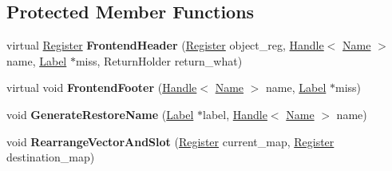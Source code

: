 \subsection*{Protected Member Functions}
\begin{DoxyCompactItemize}
\item 
virtual \hyperlink{structv8_1_1internal_1_1_register}{Register} {\bfseries Frontend\+Header} (\hyperlink{structv8_1_1internal_1_1_register}{Register} object\+\_\+reg, \hyperlink{classv8_1_1internal_1_1_handle}{Handle}$<$ \hyperlink{classv8_1_1internal_1_1_name}{Name} $>$ name, \hyperlink{classv8_1_1internal_1_1_label}{Label} $\ast$miss, Return\+Holder return\+\_\+what)\hypertarget{classv8_1_1internal_1_1_named_store_handler_compiler_a099e5c8306c4da71ad0a5193a9493e90}{}\label{classv8_1_1internal_1_1_named_store_handler_compiler_a099e5c8306c4da71ad0a5193a9493e90}

\item 
virtual void {\bfseries Frontend\+Footer} (\hyperlink{classv8_1_1internal_1_1_handle}{Handle}$<$ \hyperlink{classv8_1_1internal_1_1_name}{Name} $>$ name, \hyperlink{classv8_1_1internal_1_1_label}{Label} $\ast$miss)\hypertarget{classv8_1_1internal_1_1_named_store_handler_compiler_a155c9ac14795a0c3265b1221b7acee00}{}\label{classv8_1_1internal_1_1_named_store_handler_compiler_a155c9ac14795a0c3265b1221b7acee00}

\item 
void {\bfseries Generate\+Restore\+Name} (\hyperlink{classv8_1_1internal_1_1_label}{Label} $\ast$label, \hyperlink{classv8_1_1internal_1_1_handle}{Handle}$<$ \hyperlink{classv8_1_1internal_1_1_name}{Name} $>$ name)\hypertarget{classv8_1_1internal_1_1_named_store_handler_compiler_a5da9c7561fe36ebd6063904dec84510f}{}\label{classv8_1_1internal_1_1_named_store_handler_compiler_a5da9c7561fe36ebd6063904dec84510f}

\item 
void {\bfseries Rearrange\+Vector\+And\+Slot} (\hyperlink{structv8_1_1internal_1_1_register}{Register} current\+\_\+map, \hyperlink{structv8_1_1internal_1_1_register}{Register} destination\+\_\+map)\hypertarget{classv8_1_1internal_1_1_named_store_handler_compiler_a1729ad22abf55325df67da952bf059f1}{}\label{classv8_1_1internal_1_1_named_store_handler_compiler_a1729ad22abf55325df67da952bf059f1}

\end{DoxyCompactItemize}
